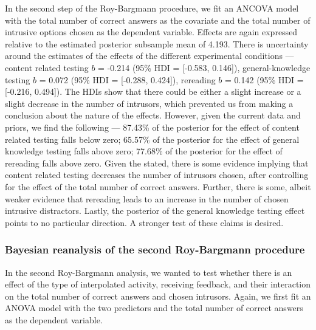 \documentclass[11pt,]{article}
\begin{document}
In the second step of the Roy-Bargmann procedure, we fit an ANCOVA model
with the total number of correct answers as the covariate and the total
number of intrusive options chosen as the dependent variable. Effects
are again expressed relative to the estimated posterior subsample mean
of 4.193. There is uncertainty around the estimates of the effects of
the different experimental conditions --- content related testing \(b\)
= -0.214 (95\% HDI = {[}-0.583, 0.146{]}), general-knowledge testing
\(b\) = 0.072 (95\% HDI = {[}-0.288, 0.424{]}), rereading \(b\) = 0.142
(95\% HDI = {[}-0.216, 0.494{]}). The HDIs show that there could be
either a slight increase or a slight decrease in the number of
intrusors, which prevented us from making a conclusion about the nature
of the effects. However, given the current data and priors, we find the
following --- 87.43\% of the posterior for the effect of content related
testing falls below zero; 65.57\% of the posterior for the effect of
general knowledge testing falls above zero; 77.68\% of the posterior for
the effect of rereading falls above zero. Given the stated, there is
some evidence implying that content related testing decreases the number
of intrusors chosen, after controlling for the effect of the total
number of correct answers. Further, there is some, albeit weaker
evidence that rereading leads to an increase in the number of chosen
intrusive distractors. Lastly, the posterior of the general knowledge
testing effect points to no particular direction. A stronger test of
these claims is desired.

\hypertarget{bayesian-reanalysis-of-the-second-roy-bargmann-procedure}{%
\subsubsection{Bayesian reanalysis of the second Roy-Bargmann
procedure}\label{bayesian-reanalysis-of-the-second-roy-bargmann-procedure}}

In the second Roy-Bargmann analysis, we wanted to test whether there is
an effect of the type of interpolated activity, receiving feedback, and
their interaction on the total number of correct answers and chosen
intrusors. Again, we first fit an ANOVA model with the two predictors
and the total number of correct answers as the dependent variable.
\end{document}

